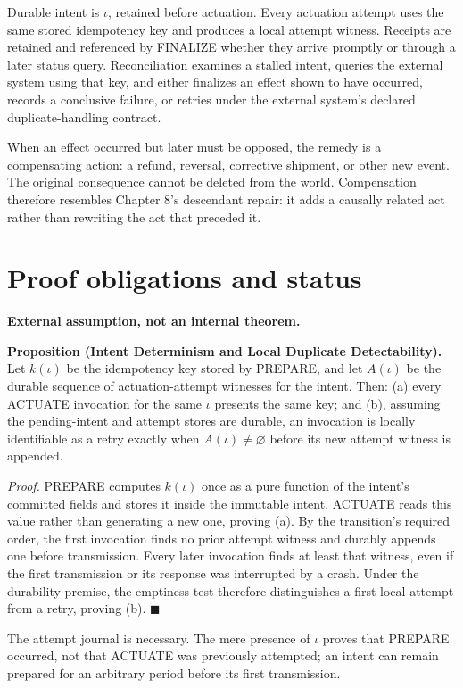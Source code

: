 \documentclass[11pt,openany]{book}
\begin{document}
Durable intent is \(\iota\), retained before actuation. Every actuation attempt
uses the same stored idempotency key and produces a local attempt witness.
Receipts are retained and referenced by FINALIZE whether they arrive promptly
or through a later status query. Reconciliation examines a stalled intent,
queries the external system using that key, and either finalizes an effect
shown to have occurred, records a conclusive failure, or retries under the
external system's declared duplicate-handling contract.

When an effect occurred but later must be opposed, the remedy is a compensating
action: a refund, reversal, corrective shipment, or other new event. The
original consequence cannot be deleted from the world. Compensation therefore
resembles Chapter 8's descendant repair: it adds a causally related act rather
than rewriting the act that preceded it.

\section{Proof obligations and status}
\textbf{External assumption, not an internal theorem.}

\textbf{Proposition (Intent Determinism and Local Duplicate
Detectability).} Let \(k(\iota)\) be the idempotency key stored by PREPARE, and
let \(A(\iota)\) be the durable sequence of actuation-attempt witnesses for the
intent. Then: (a) every ACTUATE invocation for the same \(\iota\) presents the
same key; and (b), assuming the pending-intent and attempt stores are durable,
an invocation is locally identifiable as a retry exactly when
\(A(\iota)\neq\varnothing\) before its new attempt witness is appended.

\emph{Proof.} PREPARE computes \(k(\iota)\) once as a pure function of the
intent's committed fields and stores it inside the immutable intent. ACTUATE
reads this value rather than generating a new one, proving (a). By the
transition's required order, the first invocation finds no prior attempt
witness and durably appends one before transmission. Every later invocation
finds at least that witness, even if the first transmission or its response was
interrupted by a crash. Under the durability premise, the emptiness test
therefore distinguishes a first local attempt from a retry, proving (b).
\(\blacksquare\)

The attempt journal is necessary. The mere presence of \(\iota\) proves that
PREPARE occurred, not that ACTUATE was previously attempted; an intent can
remain prepared for an arbitrary period before its first transmission.
\end{document}
